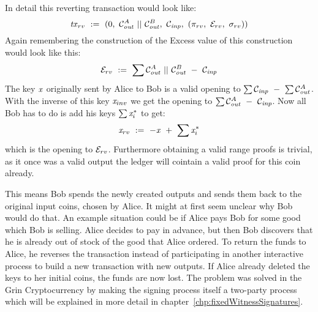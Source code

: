 In detail this reverting transaction would look like:
\[ \mathit{tx}_{rv} ~:=~ (0 ,~ \mathcal{C}_{\mathit{out}}^A ~||~ \mathcal{C}_{\mathit{out}}^B ,~ \mathcal{C}_{\mathit{inp}} ,~ (\pi_{rv} ,~ \mathcal{E}_{rv} ,~ \sigma_{rv}) ) \]
Again remembering the construction of the Excess value of this construction would look like this:
\[ \mathcal{E}_{rv} ~:=~ \sum{\mathcal{C}_{\mathit{out}}^A ~||~\mathcal{C}_{\mathit{out}}^B ~-~\mathcal{C}_{\mathit{inp}}} \]
The key $\mathit{x}$ originally sent by Alice to Bob is a valid opening to $\sum{\mathcal{C}_{\mathit{inp}}} ~-~ \sum{\mathcal{C}_{\mathit{out}}^A}$. With the inverse of this key $\mathit{x}_{inv}$ we get the opening to $\sum{\mathcal{C}_{\mathit{out}}^A ~-~\mathcal{C}_{\mathit{inp}}}$.
Now all Bob has to do is add his keys $\sum{\mathit{x}^*_i}$ to get:
\[ \mathit{x}_{rv} ~:=~ -\mathit{x} ~+~ \sum{\mathit{x}^*_i} \]
which is the opening to $\mathcal{E}_{rv}$. Furthermore obtaining a valid range proofs is trivial, as it once was a valid output the ledger will cointain a valid proof for this coin already.

This means Bob spends the newly created outputs and sends them back to the original input coins, chosen by Alice. It might at first seem unclear why Bob would do that. An example situation could be if Alice
pays Bob for some good which Bob is selling. Alice decides to pay in advance, but then Bob discovers that he is already out of stock of the good that Alice ordered. To return the funds to Alice, he reverses
the transaction instead of participating in another interactive process to build a new transaction with new outputs. If Alice already deleted the keys to her initial coins, the funds are now lost.
The problem was solved in the Grin Cryptocurrency by making the signing process itself a two-party process which will be explained in more detail in chapter~\ref{chp:fixedWitnessSignatures}.

